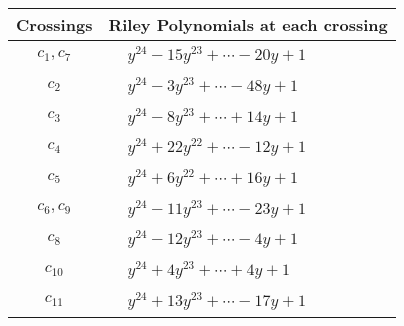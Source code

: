 \documentclass[1p]{elsarticle_modified}
\theoremstyle{definition}
\begin{document}
\begin{tabular}{m{50pt}|m{274pt}}
Crossings & \hspace{64pt}Riley Polynomials at each crossing \\
\hline $$\begin{aligned}c_{1},c_{7}\end{aligned}$$&$\begin{aligned}
&y^{24}-15 y^{23}+\cdots-20 y+1
\end{aligned}$\\
\hline $$\begin{aligned}c_{2}\end{aligned}$$&$\begin{aligned}
&y^{24}-3 y^{23}+\cdots-48 y+1
\end{aligned}$\\
\hline $$\begin{aligned}c_{3}\end{aligned}$$&$\begin{aligned}
&y^{24}-8 y^{23}+\cdots+14 y+1
\end{aligned}$\\
\hline $$\begin{aligned}c_{4}\end{aligned}$$&$\begin{aligned}
&y^{24}+22 y^{22}+\cdots-12 y+1
\end{aligned}$\\
\hline $$\begin{aligned}c_{5}\end{aligned}$$&$\begin{aligned}
&y^{24}+6 y^{22}+\cdots+16 y+1
\end{aligned}$\\
\hline $$\begin{aligned}c_{6},c_{9}\end{aligned}$$&$\begin{aligned}
&y^{24}-11 y^{23}+\cdots-23 y+1
\end{aligned}$\\
\hline $$\begin{aligned}c_{8}\end{aligned}$$&$\begin{aligned}
&y^{24}-12 y^{23}+\cdots-4 y+1
\end{aligned}$\\
\hline $$\begin{aligned}c_{10}\end{aligned}$$&$\begin{aligned}
&y^{24}+4 y^{23}+\cdots+4 y+1
\end{aligned}$\\
\hline $$\begin{aligned}c_{11}\end{aligned}$$&$\begin{aligned}
&y^{24}+13 y^{23}+\cdots-17 y+1
\end{aligned}$\\
\hline
\end{tabular}\\~\\
\end{document}
